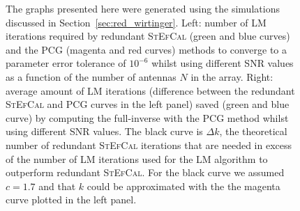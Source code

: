 \documentclass[useAMS,usenatbib]{mn2e}
\begin{document}
\begin{figure}
\centering
{}
\caption{The graphs presented here were generated using the simulations discussed in Section~\ref{sec:red_wirtinger}. Left: number of LM iterations required by redundant \textsc{StEfCal} (green and blue curves) and the PCG (magenta and red curves) methods to converge to a parameter error tolerance of $10^{-6}$ whilst using different SNR values as a function of the number of antennas $N$ in the array. Right: average amount of LM iterations (difference between the redundant \textsc{StEfCal} and PCG curves in the left panel) saved (green and blue curve) by computing the full-inverse with the PCG method whilst using different SNR values. The black curve is $\Delta k$, the theoretical number 
of redundant \textsc{StEfCal} iterations that are needed in excess of the number of LM iterations used for the LM algorithm to 
outperform redundant \textsc{StEfCal}. For the black curve we assumed $c=1.7$ and that $k$ could be approximated with the 
the magenta curve plotted in the left panel.
\label{fig:out_diff}} 
\end{figure}
\end{document}
